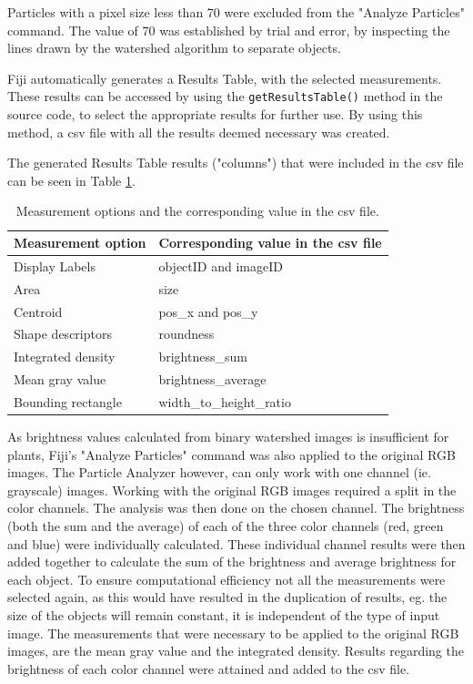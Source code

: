 \documentclass[paper=A4,bibliography=totocnumbered]{scrartcl}
\begin{document}
Particles with a pixel size less than 70 were excluded from the "Analyze Particles" command. The value of 70 was established by trial and error, by inspecting the lines drawn by the watershed algorithm to separate objects.

Fiji automatically generates a Results Table, with the selected measurements. These results can be accessed by using the \texttt{getResultsTable()} method in the source code, to select the appropriate results for further use. By using this method, a csv file with all the results deemed necessary was created. 

The generated Results Table results ("columns") that were included in the csv file can be seen in Table \ref{tab:result_table}.

\begin{table}[htbp]
	\centering
	\caption{Measurement options and the corresponding value in the csv file.}
	\begin{tabular}{ll}
		\toprule
		Measurement option  & Corresponding value in the csv file \\
		\midrule
		 Display Labels & objectID and imageID\\
		Area & size\\
		Centroid & pos\_x and pos\_y\\
		Shape descriptors & roundness\\
        Integrated density & brightness\_sum\\
      	Mean gray value & brightness\_average\\
       	Bounding rectangle & width\_to\_height\_ratio\\
        \bottomrule
	\end{tabular}
	\label{tab:result_table}
\end{table}

As brightness values calculated from binary watershed images is insufficient for plants, Fiji's "Analyze Particles" command was also applied to the original RGB images. The Particle Analyzer however, can only work with one channel (ie. grayscale) images. Working with the original RGB images required a split in the color channels. The analysis was then done on the chosen channel. The brightness (both the sum and the average) of each of the three color channels (red, green and blue) were individually calculated. These individual channel results were then added together to calculate the sum of the brightness and average brightness for each object. To ensure computational efficiency not all the measurements were selected again, as this would have resulted in the duplication of results, eg. the size of the objects will remain constant, it is independent of the type of input image. The measurements that were necessary to be applied to the original RGB images, are the mean gray value and the integrated density. Results regarding the brightness of each color channel were attained and added to the csv file. 
\end{document}
